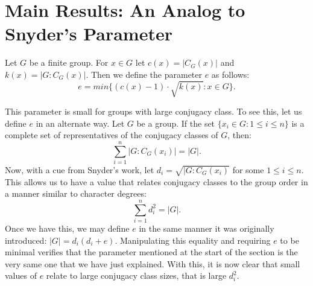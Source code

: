 \documentclass[main.tex]{subfiles}
\begin{document}
\section{Main Results: An Analog to Snyder's Parameter}

\hss

\begin{definition}
Let $G$ be a finite group. For $x \in G$ let $c(x) = |C_G(x)|$ and $k(x) = |G : C_G(x)|$. Then we define the parameter $e$ as follows:
$$e = min\{(c(x) - 1) \cdot \sqrt{k(x)} : x \in G\}\text{.}$$
\end{definition}

\hss

This parameter is small for groups with large conjugacy class. To see this, let us define $e$ in an alternate way. Let $G$ be a group. If the set $\{x_i \in G : 1 \le i \le n\}$ is a complete set of representatives of the conjugacy classes of $G$, then:
$$\sum_{i=1}^{n} |G : C_G(x_i)| = |G|\text{.}$$
Now, with a cue from Snyder's work, let $d_i = \sqrt{|G : C_G(x_i)}$ for some $1 \le i \le n$. This allows us to have a value that relates conjugacy classes to the group order in a manner similar to character degrees:
$$\sum_{i=1}^{n} d_i^2 = |G|\text{.}$$
Once we have this, we may define $e$ in the same manner it was originally introduced: $|G| = d_i(d_i + e)$. Manipulating this equality and requiring $e$ to be minimal verifies that the parameter mentioned at the start of the section is the very same one that we have just explained. With this, it is now clear that small values of $e$ relate to large conjugacy class sizes, that is large $d_i^2$.
\end{document}
